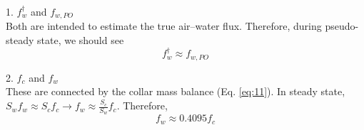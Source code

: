 \documentclass[11pt]{article}
\begin{document}
1. $f_w^{\dagger}$ and $f_{w,PO}$ \\
Both are intended to estimate the true air--water flux. Therefore, during pseudo-steady state, we should see
\begin{equation*}
	f_w^{\dagger} \approx f_{w,PO}
\end{equation*}

2. $f_c$ and $f_w$ \\
These are connected by the collar mass balance (Eq. \ref{eq:11}).
In steady state, $S_w f_w \approx S_c f_c \rightarrow f_w \approx \frac{S_c}{S_w} f_c$. Therefore,
\begin{equation*}
	f_w \approx 0.4095 f_c
\end{equation*}

\printbibliography
\end{document}
